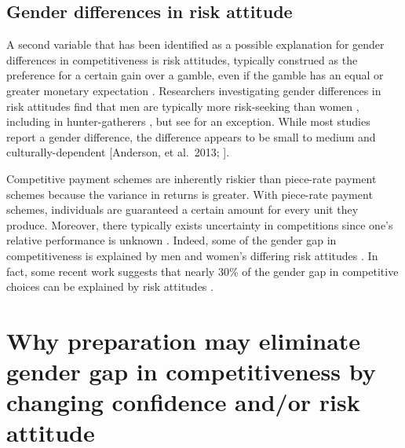 \documentclass[a4paper,nobind]{templates/ociamthesis}
\begin{document}
\hypertarget{gender-differences-in-risk-attitude}{%
\subsection{Gender differences in risk attitude}\label{gender-differences-in-risk-attitude}}

A second variable that has been identified as a possible explanation for gender differences in competitiveness is risk attitudes, typically construed as the preference for a certain gain over a gamble, even if the gamble has an equal or greater monetary expectation \autocite{Kahneman1982}. Researchers investigating gender differences in risk attitudes find that men are typically more risk-seeking than women \autocite{Eckel2008,Charness2012,Croson2009,Bertrand2010a}, including in hunter-gatherers \autocite{Apicella2017}, but see \autocite{Harrison2007} for an exception. While most studies report a gender difference, the difference appears to be small to medium \autocite{Filippin2016} and culturally-dependent {[}Anderson, et al.~2013; \textcite{Gneezy2009}{]}.

Competitive payment schemes are inherently riskier than piece-rate payment schemes because the variance in returns is greater. With piece-rate payment schemes, individuals are guaranteed a certain amount for every unit they produce. Moreover, there typically exists uncertainty in competitions since one's relative performance is unknown \autocite{Niederle2011}. Indeed, some of the gender gap in competitiveness is explained by men and women's differing risk attitudes \autocite{Niederle2011}. In fact, some recent work suggests that nearly 30\% of the gender gap in competitive choices can be explained by risk attitudes \autocite{Gillen2019,Veldhuizen2017}.

\hypertarget{why-preparation-may-eliminate-gender-gap-in-competitiveness-by-changing-confidence-andor-risk-attitude}{%
\section{Why preparation may eliminate gender gap in competitiveness by changing confidence and/or risk attitude}\label{why-preparation-may-eliminate-gender-gap-in-competitiveness-by-changing-confidence-andor-risk-attitude}}
\end{document}
